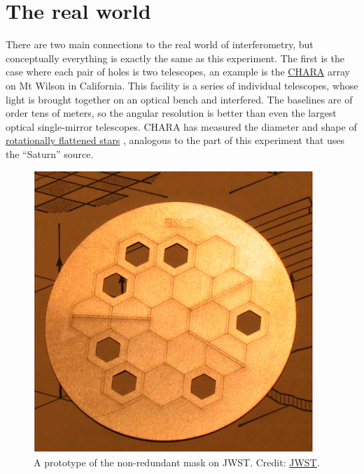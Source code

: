 \documentclass[11pt]{article}
\begin{document}
\clearpage
\section{The real world}

There are two main connections to the real world of interferometry, but conceptually everything is exactly the same as this experiment. The first is the case where each pair of holes is two telescopes, an example is the \href{https://en.wikipedia.org/wiki/CHARA_array}{CHARA} array on Mt Wilson in California. This facility is a series of individual telescopes, whose light is brought together on an optical bench and interfered. The baselines are of order tens of meters, so the angular resolution is better than even the largest optical single-mirror telescopes.
CHARA has measured the diameter and shape of \href{https://www.chara.gsu.edu/science-highlights/rapid-rotators}{rotationally flattened stars} \citep[e.g.][]{2011ApJ...732...68C}, analogous to the part of this experiment that uses the ``Saturn'' source.

\begin{figure}
    \centering
    \includegraphics{doc/NIRISS_AMI.png}
    \caption{A prototype of the non-redundant mask on JWST. Credit: \href{https://jwst-docs.stsci.edu/jwst-near-infrared-imager-and-slitless-spectrograph/niriss-observing-modes/niriss-aperture-masking-interferometry}{JWST}.}
    \label{fig:ami}
\end{figure}
\end{document}

